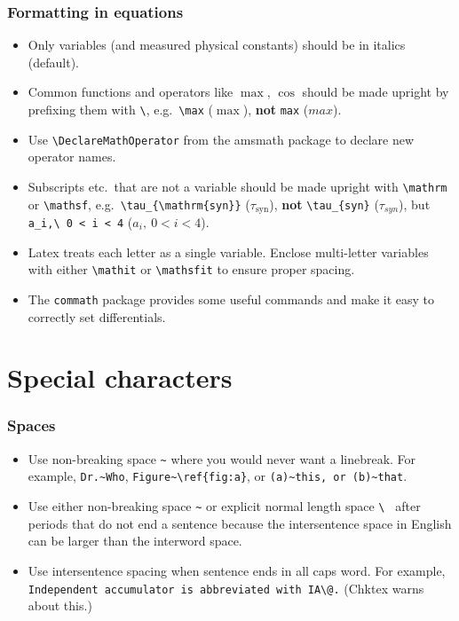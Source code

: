 \documentclass[aspectratio=1610,hyperref={colorlinks,linkcolor=}]{beamer}
\begin{document}
\begin{frame}[fragile]
    \frametitle{Formatting in equations}
    \begin{itemize}
        \item Only variables (and measured physical constants) should be in italics (default).
        \item Common functions and operators like $\max$, $\cos$ should be made upright by prefixing them with \verb+\+, e.g.~\verb+\max+ ($\max$), \textbf{not} \verb+max+ ($max$). %
        \item Use \verb+\DeclareMathOperator+ from the amsmath package to declare new operator names.
        \item Subscripts etc.~that are not a variable should be made upright with \verb+\mathrm+ or \verb+\mathsf+, e.g.~\verb+\tau_{\mathrm{syn}}+ ($\tau_{\mathrm{syn}}$), \textbf{not} \verb+\tau_{syn}+ ($\tau_{syn}$), but \verb+a_i,\ 0 < i < 4+ ($a_i,\ 0 < i < 4$).
        \item Latex treats each letter as a single variable. Enclose multi-letter variables with either \verb+\mathit+ or \verb+\mathsfit+ to ensure proper spacing.
        \item The \verb+commath+ package provides some useful commands and make it easy to correctly set differentials.
    \end{itemize}
\end{frame}

\section{Special characters}
\begin{frame}[fragile]
    \frametitle{Spaces}
    \begin{itemize}
        \item Use non-breaking space \verb+~+ where you would never want a linebreak. For example, \verb+Dr.~Who+, \verb+Figure~\ref{fig:a}+, or \verb+(a)~this, or (b)~that+.
        \item Use either non-breaking space \verb+~+ or explicit normal length space \verb*+\ + after periods that do not end a sentence because the intersentence space in English can be larger than the interword space.
        \item Use intersentence spacing when sentence ends in all caps word. For example, \verb+Independent accumulator is abbreviated with IA\@.+ (Chktex warns about this.)
    \end{itemize}
\end{frame}
\end{document}
